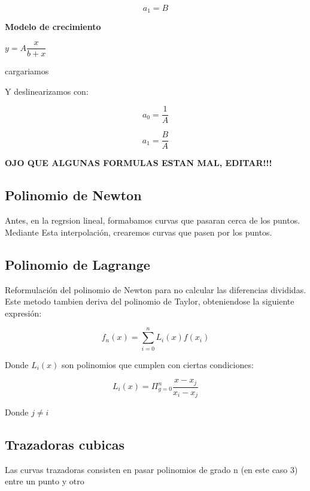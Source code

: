 \documentclass[10pt]{article}
\begin{document}
\begin{equation}
	a_1 = B
\end{equation}

\textbf{Modelo de crecimiento}

$y = A \dfrac{x}{b+x}$

cargariamos

Y deslinearizamos con:

\begin{equation}
	a_0 = \dfrac{1}{A}
\end{equation}

\begin{equation}
	a_1 = \dfrac{B}{A}
\end{equation}

\textbf{OJO QUE ALGUNAS FORMULAS ESTAN MAL, EDITAR!!!}

\subsection{Polinomio de Newton}

Antes, en la regrsion lineal, formabamos curvas que pasaran cerca de los puntos. Mediante Esta
interpolación, crearemos curvas que pasen por los puntos.

\subsection{Polinomio de Lagrange}

Reformulación del polinomio de Newton para no calcular 
las diferencias divididas. Este metodo tambien deriva del polinomio de Taylor,
obteniendose la siguiente expresión:

\begin{equation}
	f_n(x) = \sum_{i=0}^n L_i(x)f(x_i)
\end{equation}

Donde $L_i(x)$ son polinomios que cumplen con ciertas condiciones:

\begin{equation}
	L_i(x) = \Pi_{g=0}^n \dfrac{x-x_j}{x_i-x_j}
\end{equation}

Donde $j \neq i$

\subsection{Trazadoras cubicas}
Las curvas trazadoras consisten en pasar polinomios de 
grado n (en este caso 3) entre un punto y otro
\end{document}
